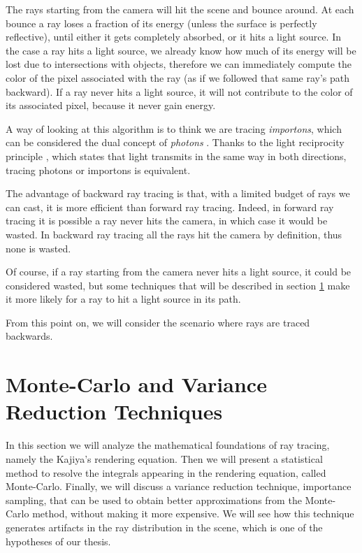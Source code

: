 \documentclass{PoliMi_MasterThesis}
\begin{document}
The rays starting from the camera will hit the scene and bounce around. At each bounce a ray loses a fraction of its energy (unless the surface is perfectly reflective), until either it gets completely absorbed, or it hits a light source. In the case a ray hits a light source, we already know how much of its energy will be lost due to intersections with objects, therefore we can immediately compute the color of the pixel associated with the ray (as if we followed that same ray's path backward). If a ray never hits a light source, it will not contribute to the color of its associated pixel, because it never gain energy.

A way of looking at this algorithm is to think we are tracing \textit{importons}, which can be considered the dual concept of \textit{photons} \cite{importons}. Thanks to the light reciprocity principle \cite{light_reciprocity}, which states that light transmits in the same way in both directions, tracing photons or importons is equivalent.

The advantage of backward ray tracing is that, with a limited budget of rays we can cast, it is more efficient than forward ray tracing. Indeed, in forward ray tracing it is possible a ray never hits the camera, in which case it would be wasted. In backward ray tracing all the rays hit the camera by definition, thus none is wasted.

Of course, if a ray starting from the camera never hits a light source, it could be considered wasted, but some techniques that will be described in section \ref{sec:monte_carlo_and_variance_reduction_techniques} make it more likely for a ray to hit a light source in its path.

From this point on, we will consider the scenario where rays are traced backwards.

\section{Monte-Carlo and Variance Reduction Techniques} \label{sec:monte_carlo_and_variance_reduction_techniques}
In this section we will analyze the mathematical foundations of ray tracing, namely the Kajiya's rendering equation. Then we will present a statistical method to resolve the integrals appearing in the rendering equation, called Monte-Carlo. Finally, we will discuss a variance reduction technique, importance sampling, that can be used to obtain better approximations from the Monte-Carlo method, without making it more expensive. We will see how this technique generates artifacts in the ray distribution in the scene, which is one of the hypotheses of our thesis.
\end{document}
